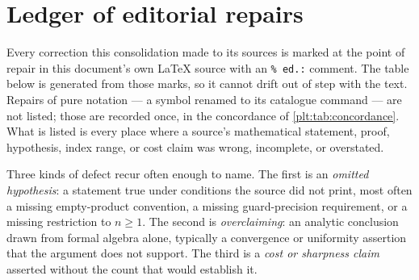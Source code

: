 \documentclass[11pt,oneside]{article}
\theoremstyle{plain}
\theoremstyle{definition}
\theoremstyle{remark}
\begin{document}
\section{Ledger of editorial repairs}
\label{plt:sec:repairs}

Every correction this consolidation made to its sources is marked at the
point of repair in this document's own \LaTeX{} source with an
\texttt{\%~ed.:} comment.  The table below is generated from those marks, so it
cannot drift out of step with the text.  Repairs of pure notation --- a
symbol renamed to its catalogue command --- are not listed; those are recorded
once, in the concordance of \cref{plt:tab:concordance}.  What is listed is
every place where a source's mathematical statement, proof, hypothesis, index
range, or cost claim was wrong, incomplete, or overstated.

Three kinds of defect recur often enough to name.  The first is an
\emph{omitted hypothesis}: a statement true under conditions the source did not
print, most often a missing empty-product convention, a missing guard-precision
requirement, or a missing restriction to \(n\ge1\).  The second is
\emph{overclaiming}: an analytic conclusion drawn from formal algebra alone,
typically a convergence or uniformity assertion that the argument does not
support.  The third is a \emph{cost or sharpness claim} asserted without the
count that would establish it.
\end{document}
